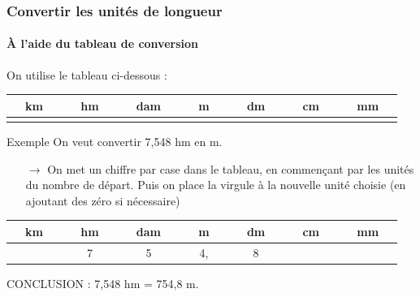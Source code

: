 \documentclass[xcolor=table]{beamer}
\begin{document}
\begin{frame}
	\frametitle{Convertir les unités de longueur}  
	\framesubtitle{À l'aide du tableau de conversion}	
	
	On utilise le tableau ci-dessous :
		\begin{small}
		\begin{center}
			\begin{tabular}{|c|c|c|c|c|c|c|}	
				\hline
					\rowcolor{gray} ~~\textbf{km}~~    &    ~~\textbf{hm}~~ &    ~~\textbf{dam}~~ & ~~\textbf{m}~~ & ~~\textbf{dm}~~ & 	~~\textbf{cm}~~ & ~~\textbf{mm}~~ \\
				\hline
					& & & & & & \\
				\hline	
			\end{tabular}	
		\end{center}
		\end{small}

	
	\begin{block}{Exemple}
		On veut convertir 7,548 hm en m.
		\begin{itemize}
			\item[$\rightarrow$] On met un chiffre par case dans le tableau, en commençant par les unités du nombre de départ. Puis on place la virgule à la nouvelle unité choisie (en ajoutant des zéro si nécessaire)
		\end{itemize}
		
		\begin{small}		
		\begin{center}
			\begin{tabular}{|c|c|c|c|c|c|c|}	
				\hline
				\rowcolor{gray} ~~\textbf{km}~~    &    ~~\textbf{hm}~~ &    ~~\textbf{dam}~~ & ~~\textbf{m}~~ & ~~\textbf{dm}~~ & 	~~\textbf{cm}~~ & ~~\textbf{mm}~~ \\
				\hline
					& 7 & 5 & 4, & 8 & & \\
				\hline	
			\end{tabular}	
		\end{center}
		\end{small}
		
		CONCLUSION : 7,548 hm = 754,8 m.
	\end{block}
	
	
\end{frame}
\end{document}
